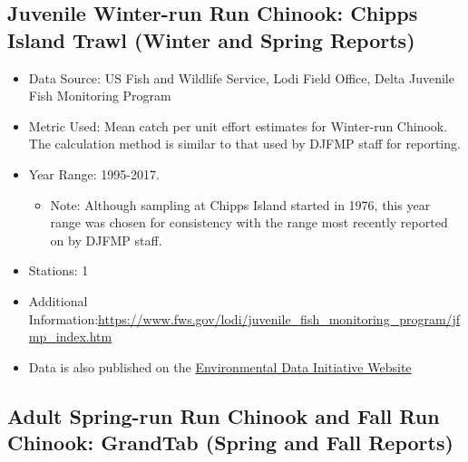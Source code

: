 \documentclass[
]{book}
\providecommand{\tightlist}{%
  \setlength{\itemsep}{0pt}\setlength{\parskip}{0pt}}
\begin{document}
\hypertarget{juvenile-winter-run-run-chinook-chipps-island-trawl-winter-and-spring-reports}{%
\subsection{Juvenile Winter-run Run Chinook: Chipps Island Trawl (Winter and Spring Reports)}\label{juvenile-winter-run-run-chinook-chipps-island-trawl-winter-and-spring-reports}}

\begin{itemize}
\tightlist
\item
  Data Source: US Fish and Wildlife Service, Lodi Field Office, Delta Juvenile Fish Monitoring Program
\item
  Metric Used: Mean catch per unit effort estimates for Winter-run Chinook. The calculation method is similar to that used by DJFMP staff for reporting.
\item
  Year Range: 1995-2017.

  \begin{itemize}
  \tightlist
  \item
    Note: Although sampling at Chipps Island started in 1976, this year range was chosen for consistency with the range most recently reported on by DJFMP staff.
  \end{itemize}
\item
  Stations: 1
\item
  Additional Information:\href{https://www.fws.gov/lo\%20+\%20Data\%20is\%20also\%20published\%20on\%20the\%20\%5BEnvironmental\%20Data\%20Initiative\%20Website\%5D(https://portal.edirepository.org/nis/mapbrowse?packageid=edi.244.4)di/juvenile_fish_monitoring_program/jfmp_index.htm}{https://www.fws.gov/lodi/juvenile\_fish\_monitoring\_program/jfmp\_index.htm}
\item
  Data is also published on the \href{https://portal.edirepository.org/nis/mapbrowse?packageid=edi.244.4}{Environmental Data Initiative Website}
\end{itemize}

\hypertarget{adult-spring-run-run-chinook-and-fall-run-chinook-grandtab-spring-and-fall-reports}{%
\subsection{Adult Spring-run Run Chinook and Fall Run Chinook: GrandTab (Spring and Fall Reports)}\label{adult-spring-run-run-chinook-and-fall-run-chinook-grandtab-spring-and-fall-reports}}
\end{document}
